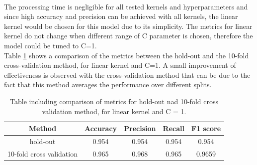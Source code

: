 \documentclass{article}
\begin{document}
\\The processing time is negligible for all tested kernels and hyperparameters and since high accuracy and precision can be achieved with all kernels, the linear kernel would be chosen for this model due to its simplicity. The metrics for linear kernel do not change when different range of C parameter is chosen, therefore the model could be tuned to C=1.
\\Table \ref{table:votings_SVM_cross} shows a comparison of the metrics between the hold-out and the 10-fold cross-validation method, for linear kernel and C=1. A small improvement of effectiveness is observed with the cross-validation method that can be due to the fact that this method averages the performance over different splits.

\begin{table}[H]
\centering
\begin{tabular}{||c c c c c||} 
 \hline
Method &  Accuracy & Precision & Recall & F1 score \\ [0.5ex] 
 \hline\hline
hold-out & 0.954 & 0.954 & 0.954 & 0.954  \\  
 10-fold cross validation &  0.965&  0.968 & 0.965& 0.9659 \\ [1ex] 
 \hline
\end{tabular}
\caption{Table including comparison of metrics for hold-out nad 10-fold cross validation method, for linear kernel and C = 1.}
\label{table:votings_SVM_cross}
\end{table}
\end{document}
